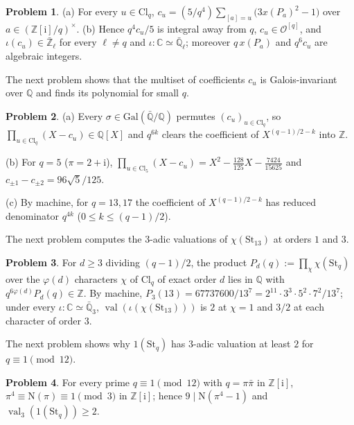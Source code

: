 \documentclass[reqno]{amsart}
\theoremstyle{definition}
\newtheorem{problem}{Problem}[section]
\theoremstyle{plain}
\theoremstyle{remark}
\newcommand{\Z}{\mathbb{Z}}
\newcommand{\Q}{\mathbb{Q}}
\newcommand{\C}{\mathbb{C}}
\newcommand{\Ql}{\bar{\mathbb{Q}}_\ell}
\newcommand{\Zl}{\bar{\mathbb{Z}}_\ell}
\newcommand{\ii}{\mathrm{i}}
\newcommand{\Oc}{\mathcal{O}}
\newcommand{\St}{\mathrm{St}}
\newcommand{\Cl}{\mathrm{Cl}}
\newcommand{\val}{\operatorname{val}}
\begin{document}
\begin{problem}\label{pr:weierstrass}
\textup{(a)} For every \(u \in \Cl_q\), \(c_u = (5/q^4) \sum_{[a] = u} \bigl(3x(P_a)^2 - 1\bigr)\) over \(a \in (\Z[\ii]/q)^\times\).
\textup{(b)} Hence \(q^4 c_u / 5\) is integral away from \(q\), \(c_u \in \Oc^{[q]}\), and \(\iota(c_u) \in \Zl\) for every \(\ell \ne q\) and \(\iota \colon \C \simeq \Ql\); moreover \(q\,x(P_a)\) and \(q^6 c_u\) are algebraic integers.
\end{problem}

The next problem shows that the multiset of coefficients \(c_u\) is Galois-invariant over \(\Q\) and finds its polynomial for small \(q\).

\begin{problem}\label{pr:poly}
\textup{(a)} Every \(\sigma \in \mathrm{Gal}(\bar{\Q}/\Q)\) permutes \((c_u)_{u \in \Cl_q}\), so \(\prod_{u \in \Cl_q}(X - c_u) \in \Q[X]\) and \(q^{6k}\) clears the coefficient of \(X^{(q-1)/2 - k}\) into \(\Z\).

\textup{(b)} For \(q = 5\) (\(\pi = 2 + \ii\)), \(\prod_{u \in \Cl_5}(X - c_u) = X^2 - \frac{128}{125}X - \frac{7424}{15625}\) and \(c_{\pm 1} - c_{\pm 2} = 96\sqrt{5}/125\).

\textup{(c)} By machine, for \(q = 13, 17\) the coefficient of \(X^{(q-1)/2 - k}\) has reduced denominator \(q^{4k}\) (\(0 \le k \le (q-1)/2\)).
\end{problem}

The next problem computes the \(3\)-adic valuations of \(\chi(\St_{13})\) at orders \(1\) and \(3\).

\begin{problem}\label{pr:unram-vals}
For \(d \ge 3\) dividing \((q-1)/2\), the product \(P_d(q) := \prod_{\chi} \chi(\St_q)\) over the \(\varphi(d)\) characters \(\chi\) of \(\Cl_q\) of exact order \(d\) lies in \(\Q\) with \(q^{6\varphi(d)} P_d(q) \in \Z\).  By machine, \(P_3(13) = 67737600/13^7 = 2^{11}\cdot 3^3\cdot 5^2\cdot 7^2/13^7\); under every \(\iota \colon \C \simeq \bar{\Q}_3\), \(\val(\iota(\chi(\St_{13})))\) is \(2\) at \(\chi = 1\) and \(3/2\) at each character of order \(3\).
\end{problem}

The next problem shows why \(1(\St_q)\) has \(3\)-adic valuation at least \(2\) for \(q \equiv 1 \pmod{12}\).

\begin{problem}\label{pr:price}
For every prime \(q \equiv 1 \pmod{12}\) with \(q = \pi\bar\pi\) in \(\Z[\ii]\), \(\pi^4 \equiv \mathrm{N}(\pi) \equiv 1 \pmod 3\) in \(\Z[\ii]\); hence \(9 \mid \mathrm{N}(\pi^4 - 1)\) and \(\val_3(1(\St_q)) \ge 2\).
\end{problem}
\end{document}
